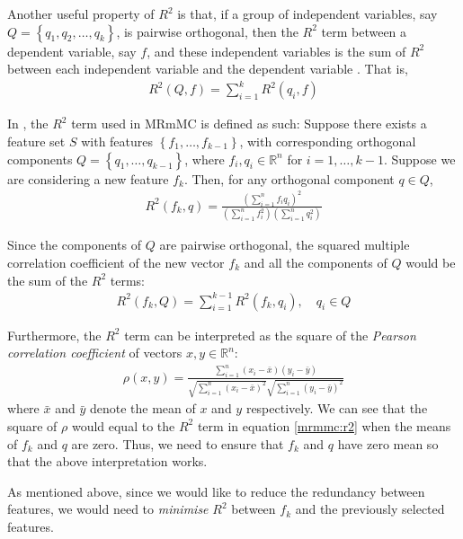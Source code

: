 \documentclass[12pt, twoside, a4paper]{report}
\begin{document}
Another useful property of $R^2$ is that, if a group of independent variables, say $Q=\left\lbrace q_1, q_2, \dots, q_k \right\rbrace$, is pairwise orthogonal, then the $R^2$ term between a dependent variable, say $f$, and these independent variables is the sum of $R^2$ between each independent variable and the dependent variable \cite{RefWorks:193}. That is,
\begin{align*}
R^2(Q, f) = \sum_{i=1}^k R^2(q_i, f)
\end{align*}

In \cite{RefWorks:187}, the $R^2$ term used in MRmMC is defined as such: Suppose there exists a feature set $S$ with features $\left\lbrace f_1 , \dots , f_{k-1} \right\rbrace$, with corresponding orthogonal components $Q= \left\lbrace q_1, \dots , q_{k-1} \right\rbrace$, where $f_i, q_i \in \mathbb{R}^n$ for $i=1, \dots, k-1$. Suppose we are considering a new feature $f_k$. Then, for any orthogonal component $q \in Q$,
\begin{align}
R^2(f_k, q) = \frac{\left( \sum_{i=1}^n f_iq_i \right)^2}{\left(\sum_{i=1}^n f_i^2 \right) \left( \sum_{i=1}^n q_i^2 \right)} \label{mrmmc:r2}
\end{align}

Since the components of $Q$ are pairwise orthogonal, the squared multiple correlation coefficient of the new vector $f_k$ and all the components of $Q$ would be the sum of the $R^2$ terms:
\begin{align*}
R^2(f_k, Q) = \sum_{i=1}^{k-1} R^2(f_k, q_i), \quad q_i \in Q
\end{align*}

Furthermore, the $R^2$ term can be interpreted as the square of the \textit{Pearson correlation coefficient} of vectors $x,y \in \mathbb{R}^n$:
\begin{align*}
\rho(x, y) = \frac{\sum_{i=1}^n (x_i - \bar{x})(y_i - \bar{y})}{\sqrt{\sum_{i=1}^n (x_i-\bar{x})^2}\sqrt{\sum_{i=1}^n (y_i-\bar{y})^2}}
\end{align*}
where $\bar{x}$ and $\bar{y}$ denote the mean of $x$ and $y$ respectively. We can see that the square of $\rho$ would equal to the $R^2$ term in equation \ref{mrmmc:r2} when the means of $f_k$ and $q$ are zero. Thus, we need to ensure that $f_k$ and $q$ have zero mean so that the above interpretation works.

As mentioned above, since we would like to reduce the redundancy between features, we would need to \textit{minimise} $R^2$ between $f_k$ and the previously selected features.
\end{document}
